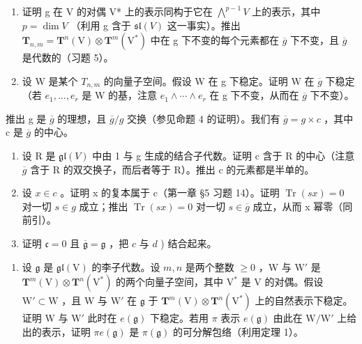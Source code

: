 \begin{enumerate}
\def\labelenumi{\alph{enumi})}
\item
  证明 g 在 V 的对偶 V* 上的表示同构于它在 \(\bigwedge^{p-1}V\) 上的表示，其中 \(p = \dim V\) （利用 g 含于 \(\mathfrak{sl}(V)\) 这一事实）。推出 \(\mathbf{T}_{n,m} = \mathbf{T}^{n}(\mathrm{V}) \otimes \mathbf{T}^{m}(\mathrm{V}^{*})\) 中在 g 下不变的每个元素都在 \(\overline{g}\) 下不变，且 \(\overline{g}\) 是代数的（习题 5）。
\item
  设 W 是某个 \(T_{n,m}\) 的向量子空间。假设 W 在 g 下稳定。证明 W 在 \(\overline{g}\) 下稳定（若 \(e_{1},\ldots,e_{r}\) 是 W 的基，注意 \(e_{1}\wedge\cdots\wedge e_{r}\) 在 g 下不变，从而在 \(\overline{g}\) 下不变）。
\end{enumerate}

推出 g 是 \(\overline{g}\) 的理想，且 \(\overline{g}/g\) 交换（参见命题 4 的证明）。我们有 \(\overline{g} = g \times c\) ，其中 c 是 \(\overline{g}\) 的中心。

\begin{enumerate}
\def\labelenumi{\alph{enumi})}
\setcounter{enumi}{2}
\item
  设 R 是 \(\mathfrak{gl}(V)\) 中由 1 与 g 生成的结合子代数。证明 c 含于 R 的中心（注意 \(\overline{g}\) 含于 R 的双交换子，而后者等于 R）。推出 c 的元素都是半单的。
\item
  设 \(x \in c\) 。证明 x 的复本属于 c（第一章 §5 习题 14）。证明 \(\operatorname{Tr}(sx) = 0\) 对一切 \(s \in g\) 成立；推出 \(\operatorname{Tr}(sx) = 0\) 对一切 \(s \in \overline{g}\) 成立，从而 x 幂零（同前引）。
\item
  证明 \(\mathfrak{c} = 0\) 且 \(\overline{\mathfrak{g}} = \mathfrak{g}\) ，把 \(c\) 与 \(d\) ) 结合起来。
\end{enumerate}

\begin{enumerate}
\def\labelenumi{\arabic{enumi})}
\setcounter{enumi}{6}
\tightlist
\item
  设 \(\mathfrak{g}\) 是 \(\mathfrak{gl}(\mathrm{V})\) 的李子代数。设 \(m, n\) 是两个整数 \(\geq 0\) ，W 与 \(\mathrm{W}'\) 是 \(\mathbf{T}^m(\mathrm{V}) \otimes \mathbf{T}^n(\mathrm{V}^*)\) 的两个向量子空间，其中 \(\mathrm{V}^*\) 是 V 的对偶。假设 \(\mathrm{W}' \subset \mathrm{W}\) ，且 W 与 \(\mathrm{W}'\) 在 \(\mathfrak{g}\) 于 \(\mathbf{T}^m(\mathrm{V}) \otimes \mathbf{T}^n(\mathrm{V}^*)\) 上的自然表示下稳定。证明 W 与 \(\mathrm{W}'\) 此时在 \(e(\mathfrak{g})\) 下稳定。若用 \(\pi\) 表示 \(e(\mathfrak{g})\) 由此在 \(\mathrm{W/W}'\) 上给出的表示，证明 \(\pi e(\mathfrak{g})\) 是 \(\pi(\mathfrak{g})\) 的可分解包络（利用定理 1）。
\end{enumerate}

